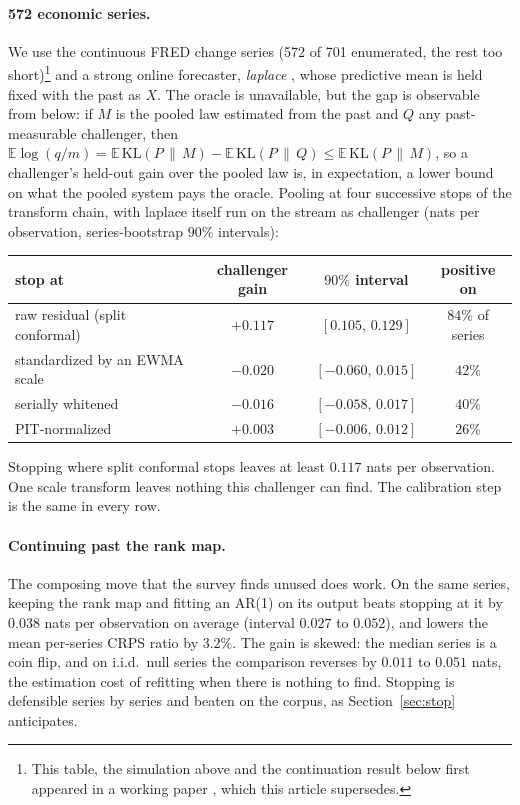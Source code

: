 \documentclass[11pt]{article}
\theoremstyle{definition}
\newcommand{\E}{\mathbb{E}}
\newcommand{\KL}{\mathrm{KL}}
\begin{document}
\paragraph{572 economic series.} We use the continuous FRED change series (572 of 701
enumerated, the rest too short)\footnote{This table, the simulation above and the
continuation result below first appeared in a working paper \citep{cotton2026gap}, which this
article supersedes.} and a strong online forecaster, \emph{laplace}
\citep{cotton_skaters}, whose predictive mean is held fixed with the past as $X$. The oracle
is unavailable, but the gap is observable from below: if $M$ is the pooled law estimated from
the past and $Q$ any past-measurable challenger, then
$\E\log(q/m)=\E\,\KL(P\,\|\,M)-\E\,\KL(P\,\|\,Q)\le\E\,\KL(P\,\|\,M)$, so a challenger's
held-out gain over the pooled law is, in expectation, a lower bound on what the pooled system
pays the oracle. Pooling at four successive stops of the transform chain, with laplace itself
run on the stream as challenger (nats per observation, series-bootstrap $90\%$ intervals):
\begin{center}
\small
\begin{tabular}{lccc}
\toprule
stop at & challenger gain & $90\%$ interval & positive on\\
\midrule
raw residual (split conformal) & $+0.117$ & $[0.105,\,0.129]$ & $84\%$ of series\\
standardized by an EWMA scale & $-0.020$ & $[-0.060,\,0.015]$ & $42\%$\\
serially whitened & $-0.016$ & $[-0.058,\,0.017]$ & $40\%$\\
PIT-normalized & $+0.003$ & $[-0.006,\,0.012]$ & $26\%$\\
\bottomrule
\end{tabular}
\end{center}
Stopping where split conformal stops leaves at least $0.117$ nats per observation. One scale
transform leaves nothing this challenger can find. The calibration step is the same in every
row.

\paragraph{Continuing past the rank map.} The composing move that the survey finds unused
does work. On the same series, keeping the rank map and fitting an AR(1) on its output beats
stopping at it by $0.038$ nats per observation on average (interval $0.027$ to $0.052$), and
lowers the mean per-series CRPS ratio by $3.2\%$. The gain is skewed: the median series is a
coin flip, and on i.i.d.\ null series the comparison reverses by $0.011$ to $0.051$ nats, the
estimation cost of refitting when there is nothing to find. Stopping is defensible series by
series and beaten on the corpus, as Section~\ref{sec:stop} anticipates.
\end{document}
